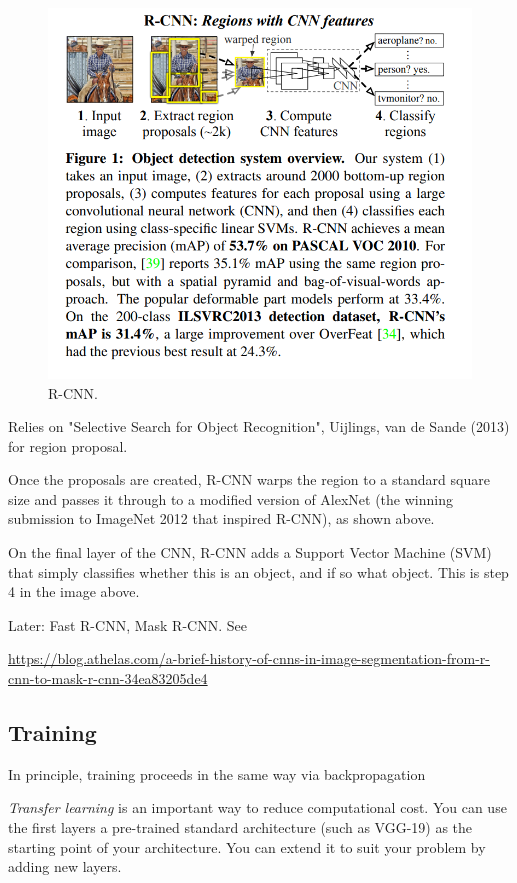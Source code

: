 \documentclass[english]{article}
\begin{document}
\begin{figure}
  \centering
  \includegraphics[scale=0.7]{rcnn.png}
    \caption{R-CNN.}
    \label{rcnn}
\end{figure}

Relies on "Selective Search for Object Recognition", Uijlings, van de Sande (2013) for region proposal.

Once the proposals are created, R-CNN warps the region to a standard square size and passes it through to a modified version of AlexNet (the winning submission to ImageNet 2012 that inspired R-CNN), as shown above.

On the final layer of the CNN, R-CNN adds a Support Vector Machine (SVM) that simply classifies whether this is an object, and if so what object. This is step 4 in the image above.

Later: Fast R-CNN, Mask R-CNN. See  

\url{https://blog.athelas.com/a-brief-history-of-cnns-in-image-segmentation-from-r-cnn-to-mask-r-cnn-34ea83205de4}
\eenum

\subsection{Training}
\benum
\item In principle, training proceeds in the same way via backpropagation
\item \emph{Transfer learning} is an important way to reduce computational cost. You can use the first layers a pre-trained standard architecture (such as VGG-19) as the starting point of your architecture. You can extend it to suit your problem by adding new layers. 
\end{document}
